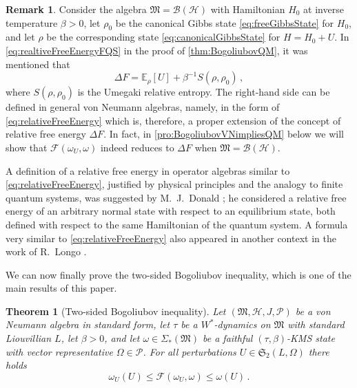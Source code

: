 \documentclass[a4paper, twoside, 11pt, reqno]{amsart}
\theoremstyle{definition}
\newtheorem{remark}[definition]{Remark}
\theoremstyle{plain}
\newtheorem{theorem}[definition]{Theorem}
\renewcommand{\Delta}{\varDelta}
\renewcommand{\Sigma}{\varSigma}
\renewcommand{\Omega}{\varOmega}
\newcommand{\MF}{\mathcal{F}}
\newcommand{\MH}{\mathcal{H}}
\newcommand{\MFM}{\mathfrak{M}}
\newcommand{\MFS}{\mathfrak{S}}
\newcommand{\BO}{\mathscr{B}}
\newcommand{\NS}[1]{\Sigma_{\ast}(#1)}
\newcommand{\NPC}{\mathcal{P}}
\newcommand{\1}{\mathbf{1}}
\newcommand{\EV}{\mathbb{E}}
\newcommand{\inv}[1]{#1^{-1}}
\begin{document}
\begin{remark}
    Consider the algebra $\MFM = \BO(\MH)$ with Hamiltonian $H_0$ at inverse temperature $\beta > 0$, let $\rho_0$ be the canonical Gibbs state \eqref{eq:freeGibbsState} for $H_0$, and let $\rho$ be the corresponding state \eqref{eq:canonicalGibbsState} for $H = H_0 + U$. In \cref{eq:realtiveFreeEnergyFQS} in the proof of \cref{thm:BogoliubovQM}, it was mentioned that
    \begin{equation*}
        \Delta F = \EV_\rho[U] + \inv{\beta} S(\rho, \rho_0) \, ,
    \end{equation*}
    where $S(\rho, \rho_0)$ is the Umegaki relative entropy. The right-hand side can be defined in general von Neumann algebras, namely, in the form of \cref{eq:relativeFreeEnergy} which is, therefore, a proper extension of the concept of relative free energy $\Delta F$. In fact, in \cref{pro:BogoliubovVNimpliesQM} below we will show that $\MF(\omega_U, \omega)$ indeed reduces to $\Delta F$ when $\MFM = \BO(\MH)$.
    
    A definition of a relative free energy in operator algebras similar to \cref{eq:relativeFreeEnergy}, justified by physical principles and the analogy to finite quantum systems, was suggested by M.~J.~Donald \cite[Eq.~(1.2)]{Donald1987}; he considered a relative free energy of an arbitrary normal state with respect to an equilibrium state, both defined with respect to the same Hamiltonian of the quantum system. A formula very similar to \cref{eq:relativeFreeEnergy} also appeared in another context in the work of R.~Longo \cite[Eq. (3.6)]{Longo1997}.
\end{remark}

We can now finally prove the two-sided Bogoliubov inequality, which is one of the main results of this paper.

\begin{theorem}[Two-sided Bogoliubov inequality]\label{thm:BogoliubovVN}
    Let $(\MFM, \MH, J, \NPC)$ be a von Neumann algebra in standard form, let $\tau$ be a $W^\ast$-dynamics on $\MFM$ with standard Liouvillian $L$, let $\beta > 0$, and let $\omega \in \NS{\MFM}$ be a faithful $(\tau, \beta)$-KMS state with vector representative $\Omega \in \NPC$. For all perturbations $U \in \MFS_2(L, \Omega)$ there holds
    \begin{equation}\label{eq:BogoliubovVN}
        \omega_U(U) \le \MF(\omega_U, \omega) \le \omega(U) \, .
    \end{equation}
\end{theorem}
\end{document}
